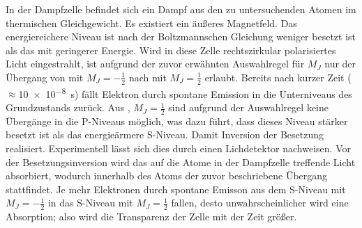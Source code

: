 In der Dampfzelle befindet sich ein Dampf aus den zu untersuchenden Atomen im thermischen Gleichgewicht. Es existiert ein äußeres Magnetfeld. Das energiereichere Niveau ist nach der Boltzmannschen Gleichung weniger besetzt ist als das mit geringerer Energie. Wird in diese Zelle rechtszirkular polarisiertes Licht eingestrahlt, ist aufgrund der zuvor erwähnten Auswahlregel für $M_J$ nur der Übergang von  mit $M_J=-\frac{1}{2}$ nach  mit $M_J=\frac{1}{2}$ erlaubt. Bereits nach kurzer Zeit ($\approx$\SI{10e-8}{\second}) fällt Elektron durch spontane Emission in die Unterniveaus des Grundzustands zurück. Aus , $M_J= \frac{1}{2}$ sind aufgrund der Auswahlregel keine Übergänge in die P-Niveaus möglich, was dazu führt, dass dieses Niveau stärker besetzt ist als das energieärmere S-Niveau. Damit Inversion der Besetzung realisiert. Experimentell lässt sich dies durch einen Lichdetektor nachweisen. Vor der Besetzungsinversion wird das auf die  Atome in der Dampfzelle  treffende Licht absorbiert, wodurch innerhalb des Atoms der zuvor beschriebene Übergang stattfindet. Je mehr Elektronen durch spontane Emisson aus dem S-Niveau mit $M_J=-\frac{1}{2}$ in das S-Niveau mit $M_J = \frac{1}{2}$ fallen, desto unwahrscheinlicher wird eine Absorption; also wird die Transparenz der Zelle mit der Zeit größer.


